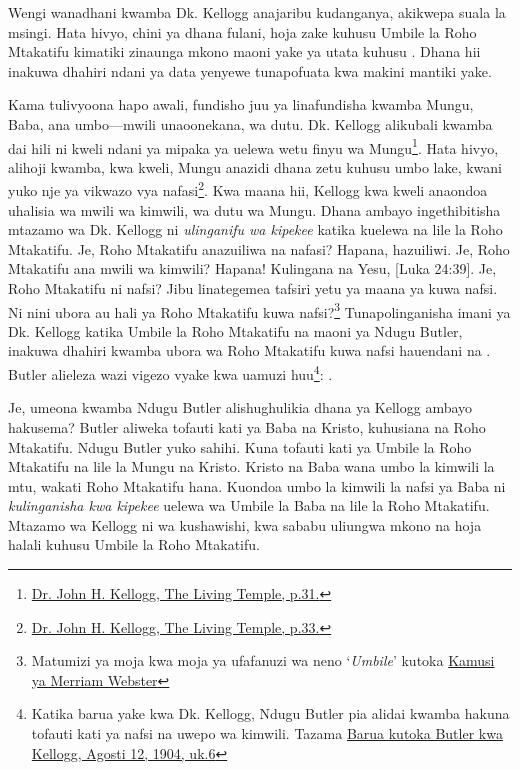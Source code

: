 Wengi wanadhani kwamba Dk. Kellogg anajaribu kudanganya, akikwepa suala la msingi. Hata hivyo, chini ya dhana fulani, hoja zake kuhusu Umbile la Roho Mtakatifu kimatiki zinaunga mkono maoni yake ya utata kuhusu . Dhana hii inakuwa dhahiri ndani ya data yenyewe tunapofuata kwa makini mantiki yake.


Kama tulivyoona hapo awali, fundisho juu ya  linafundisha kwamba Mungu, Baba, ana umbo—mwili unaoonekana, wa dutu. Dk. Kellogg alikubali kwamba dai hili ni kweli ndani ya mipaka ya uelewa wetu finyu wa Mungu\footnote{\href{https://archive.org/details/J.H.Kellogg.TheLivingTemple1903/page/n33/}{Dr. John H. Kellogg, The Living Temple, p.31.}}. Hata hivyo, alihoji kwamba, kwa kweli, Mungu anazidi dhana zetu kuhusu umbo lake, kwani yuko nje ya vikwazo vya nafasi\footnote{\href{https://archive.org/details/J.H.Kellogg.TheLivingTemple1903/page/n33/}{Dr. John H. Kellogg, The Living Temple, p.33.}}. Kwa maana hii, Kellogg kwa kweli anaondoa uhalisia wa mwili wa kimwili, wa dutu wa Mungu. Dhana ambayo ingethibitisha mtazamo wa Dk. Kellogg ni \textit{ulinganifu wa kipekee} katika kuelewa  na lile la Roho Mtakatifu. Je, Roho Mtakatifu anazuiliwa na nafasi? Hapana, hazuiliwi. Je, Roho Mtakatifu ana mwili wa kimwili? Hapana! Kulingana na Yesu, [Luka 24:39]. Je, Roho Mtakatifu ni nafsi? Jibu linategemea tafsiri yetu ya maana ya kuwa nafsi. Ni nini ubora au hali ya Roho Mtakatifu kuwa nafsi?\footnote{Matumizi ya moja kwa moja ya ufafanuzi wa neno ‘\textit{Umbile}’ kutoka \href{https://www.merriam-webster.com/dictionary/personality}{Kamusi ya Merriam Webster}} Tunapolinganisha imani ya Dk. Kellogg katika Umbile la Roho Mtakatifu na maoni ya Ndugu Butler, inakuwa dhahiri kwamba ubora wa Roho Mtakatifu kuwa nafsi hauendani na . Butler alieleza wazi vigezo vyake kwa uamuzi huu\footnote{Katika barua yake kwa Dk. Kellogg, Ndugu Butler pia alidai kwamba hakuna tofauti kati ya nafsi na uwepo wa kimwili. Tazama \href{https://c7da.us/egwdl/Butler\%20to\%20Kellogg\%20Aug121904.pdf}{Barua kutoka Butler kwa Kellogg, Agosti 12, 1904, uk.6}}: .


Je, umeona kwamba Ndugu Butler alishughulikia dhana ya Kellogg ambayo hakusema? Butler aliweka tofauti kati ya Baba na Kristo, kuhusiana na Roho Mtakatifu. Ndugu Butler yuko sahihi. Kuna tofauti kati ya Umbile la Roho Mtakatifu na lile la Mungu na Kristo. Kristo na Baba wana umbo la kimwili la mtu, wakati Roho Mtakatifu hana. Kuondoa umbo la kimwili la nafsi ya Baba ni \textit{kulinganisha kwa kipekee} uelewa wa Umbile la Baba na lile la Roho Mtakatifu. Mtazamo wa Kellogg ni wa kushawishi, kwa sababu uliungwa mkono na hoja halali kuhusu Umbile la Roho Mtakatifu.



